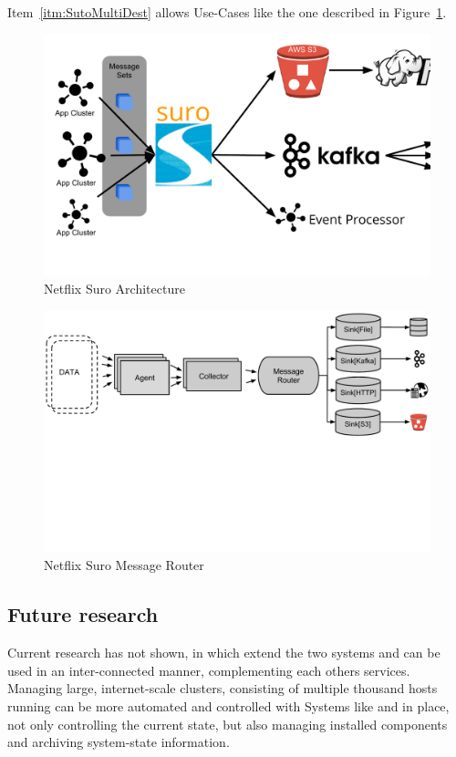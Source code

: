 Item~\ref{itm:SutoMultiDest} allows Use-Cases like the one described in Figure~\ref{fig:SuroArchitecture}. 
\label{netflix}
\begin{figure}[hbt]
  \centering
  \includegraphics[width=\linewidth,clip=true,trim=5mm 2cm 0 5mm]{images/NetflixSuro}
  \caption{Netflix Suro Architecture~\cite{Bae2013, Harris2013}}
  \label{fig:SuroArchitecture}
\end{figure}

\begin{figure}[hbt]
  \centering
  \includegraphics[width=\linewidth,clip=true,trim=0 75mm 0 0]{images/SuroMessageRouter}
  \caption{Netflix Suro Message Router~\cite{Bae2013}}
  \label{fig:SuroMessageRouter}
\end{figure}


\subsection{Future research}
Current research has not shown, in which extend the two systems \amblong and \chuk can be used in an inter-connected manner, complementing each others services. Managing large, internet-scale clusters, consisting of multiple thousand hosts running \hadooplong can be more automated and controlled with Systems like \amb and \chuk in place, not only controlling the current state, but also managing installed components and archiving system-state information.

